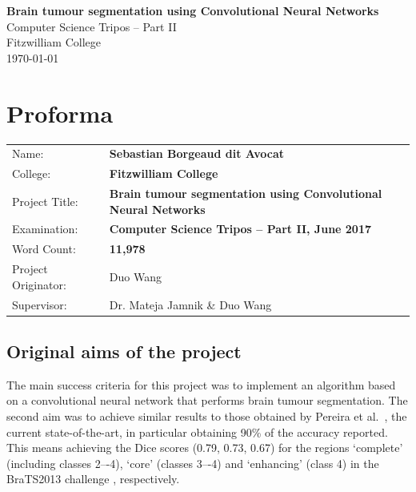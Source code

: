 \documentclass[12pt,a4paper,twoside,openright]{report}
\begin{document}





\pagestyle{empty}


\vspace*{60mm}
\begin{center}
\Huge
\textbf{Brain tumour segmentation using Convolutional Neural Networks} \\[5mm]
Computer Science Tripos -- Part II \\[5mm]
Fitzwilliam College \\[5mm]
\today  %
\end{center}


\pagestyle{plain}

\chapter*{Proforma}

{\large
\begin{tabular}{lp{12cm}}
Name:               & \bf Sebastian Borgeaud dit Avocat                       \\
College:            & \bf Fitzwilliam College                     \\
Project Title:      & \bf Brain tumour segmentation using Convolutional Neural Networks\\
Examination:        & \bf Computer Science Tripos -- Part II, June 2017  \\
Word Count:         & \bf 11,978\footnotemark[1]
  \\
Project Originator: & Duo Wang                    \\
Supervisor:         & Dr. Mateja Jamnik \& Duo Wang                    \\ 
\end{tabular}
}
\section*{Original aims of the project}
The main success criteria for this project was to implement an algorithm based on a convolutional neural network that performs brain tumour segmentation. The second aim was to achieve similar results to those obtained by Pereira et al.\ \cite{pereira}, the current \mbox{state-of-the-art}, in particular obtaining 90\% of the accuracy reported. This means achieving the Dice scores (0.79, 0.73, 0.67) for the regions `complete' (including classes 2–-4), ‘core’ (classes 3–-4) and ‘enhancing’ (class 4) in the BraTS2013 challenge \cite{brats-proceedings}, respectively.
\end{document}
